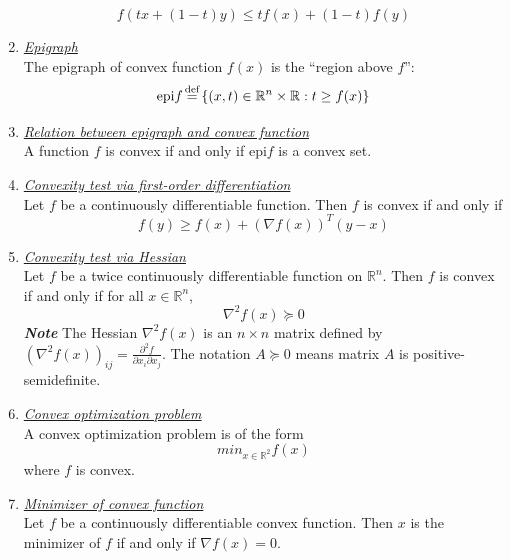 \documentclass[12pt]{article}
\newcommand\defeq{\stackrel{\mathclap{\normalfont\mbox{\scriptsize def}}}{=}}
\newcommand{\istart}[1]{\underline{\textit{#1}}\\}
\newcommand{\idetail}[1]{\footnotesize\textbf{\emph{#1}}\normalsize}
\newcommand{\bR}{\mathbb{R}}
\begin{document}
\begin{enumerate}
    $$f(tx+(1-t)y)\leq tf(x)+(1-t)f(y)$$
  \item \istart{Epigraph}
    The epigraph of convex function $f(x)$ is the ``region above $f$'':
    $$\text{epi}f\defeq\{(x,t)\in\bR^n\times\bR: t\geq f(x)\}$$
  \item \istart{Relation between epigraph and convex function}
    A function $f$ is convex if and only if epi$f$ is a convex set.
  \item \istart{Convexity test via first-order differentiation}
    Let $f$ be a continuously differentiable function. Then $f$ is convex if and only if
    $$f(y)\geq f(x)+(\nabla f(x))^T(y-x)$$
  \item \istart{Convexity test via Hessian}
    Let $f$ be a twice continuously differentiable function on $\bR^n$. Then $f$ is convex if and only if for all $x\in\bR^n$,
    $$\nabla^2f(x)\succeq 0$$
    \idetail{Note} The Hessian $\nabla^2f(x)$ is an $n\times n$ matrix defined by $(\nabla^2f(x))_{ij}=\frac{\partial^2 f}{\partial x_i\partial x_j}$. The notation $A\succeq 0$ means matrix $A$ is positive-semidefinite.
  \item \istart{Convex optimization problem} A convex optimization problem is of the form
    $$ min_{x\in\bR^2} f(x)$$
    where $f$ is convex.
  \item \istart{Minimizer of convex function} Let $f$ be a continuously differentiable convex function. Then $x$ is the minimizer of $f$ if and only if $\nabla f(x)=0$.
  
\end{enumerate}
\end{document}
